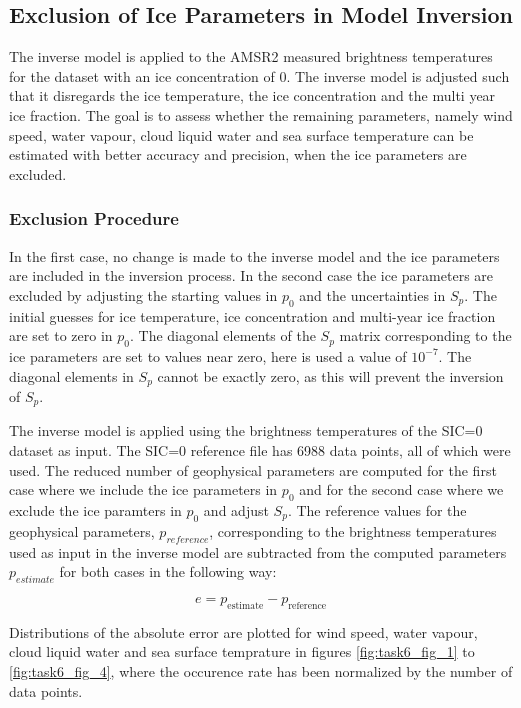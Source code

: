 \documentclass[11pt, a4paper]{article}
\begin{document}
\subsection{Exclusion of Ice Parameters in Model Inversion}
The inverse model is applied to the AMSR2 measured brightness temperatures for the dataset with an ice concentration of 0. The inverse model is adjusted such that it disregards the ice temperature, the ice concentration and the multi year ice fraction. The goal is to assess whether the remaining parameters, namely wind speed, water vapour, cloud liquid water and sea surface temperature can be estimated with better accuracy and precision, when the ice parameters are excluded.   

\subsubsection{Exclusion Procedure}
In the first case, no change is made to the inverse model and the ice parameters are included in the inversion process. In the second case the ice parameters are excluded by adjusting the starting values in \(p_0\) and the uncertainties in \(S_p\). The initial guesses for ice temperature, ice concentration and multi-year ice fraction are set to zero in \(p_0\). The diagonal elements of the \(S_p\) matrix corresponding to the ice parameters are set to values near zero, here is used a value of \(10^{-7}\). The diagonal elements in \(S_p\) cannot be exactly zero, as this will prevent the inversion of \(S_p\).  
\newline

The inverse model is applied using the brightness temperatures of the SIC=0 dataset as input. The SIC=0 reference file has 6988 data points, all of which were used. The reduced number of geophysical parameters are computed for the first case where we include the ice parameters in \(p_0\) and for the second case where we exclude the ice paramters in \(p_0\) and adjust \(S_p\). The reference values for the geophysical parameters, \(p_{reference}\), corresponding to the brightness temperatures used as input in the inverse model are subtracted from the computed parameters \(p_{estimate}\) for both cases in the following way:

\begin{equation*}
e = p_\text{estimate} - p_\text{reference}
\end{equation*} 

Distributions of the absolute error are plotted for wind speed, water vapour, cloud liquid water and sea surface temprature in figures \ref{fig:task6_fig_1} to \ref{fig:task6_fig_4}, where the occurence rate has been normalized by the number of data points.   
\newline
\end{document}
